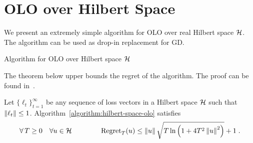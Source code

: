 \section{\ac{OLO} over Hilbert Space}

We present an extremely simple algorithm for \ac{OLO}
over real Hilbert space $\mathcal{H}$. The algorithm can be used as drop-in replacement for
\ac{GD}.

\begin{algorithm}[h]
\caption{Algorithm for OLO over Hilbert space $\mathcal{H}$
\label{algorithm:hilbert-space-olo}}
\begin{algorithmic}
{
\ENDFOR
}
\end{algorithmic}
\end{algorithm}

The theorem below upper bounds the regret of the algorithm.
The proof can be found in~\cite{Orabona-Pal-2016-parameter-free}.

\begin{theorem}
\label{theorem:hilbert-space-olo-regret}
Let $\{\ell_t\}_{t=1}^\infty$ be any sequence of loss vectors
in a Hilbert space $\mathcal{H}$ such that $\left\|{\ell_t}\right\| \le 1$.
Algorithm~\ref{algorithm:hilbert-space-olo} satisfies
$$
\forall \, T \ge 0 \quad
\forall u \in \mathcal{H} \qquad \qquad
\operatorname{Regret}_T(u) \le \left\|{u}\right\| \sqrt{T \ln\left(1 + 4T^2 \left\|{u}\right\|^2 \right)} + 1 \;.
$$
\end{theorem}
